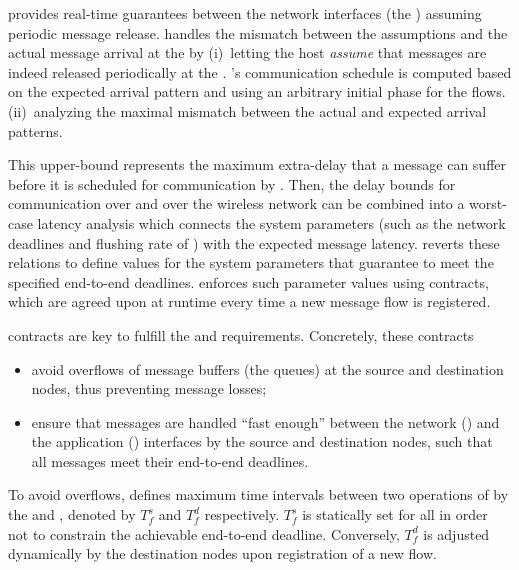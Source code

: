 \blink provides real-time guarantees between the network interfaces (\ie the \CPs) assuming periodic message release. \DRP handles the mismatch between the \blink assumptions and the actual message arrival at the \CPs by
(i)~letting the host \emph{assume} that messages are indeed released periodically at the \CPs.
  \blink's communication schedule is computed based on the expected arrival pattern and using an arbitrary initial phase for the flows.
(ii)~analyzing the maximal mismatch between the actual and expected arrival patterns.

This upper-bound represents the maximum extra-delay that a message can suffer before it is scheduled for communication by \blink.
Then, the delay bounds for communication over \bolt and over the wireless network can be combined into a worst-case latency analysis which connects the system parameters (such as the network deadlines and flushing rate of \bolt) with the expected message latency.
\DRP reverts these relations to define values for the system parameters
that guarantee to meet the specified end-to-end deadlines.
\DRP enforces such parameter values using contracts, which are agreed upon at runtime every time a new message flow is registered.

\DRP contracts are key to fulfill the  and  requirements. Concretely, these contracts
\begin{itemize}
  \item avoid overflows of message buffers (\eg the \bolt queues) at the source and destination nodes, thus preventing message losses;
  \item ensure that messages are handled ``fast enough'' between the network (\ie \CPs) and the application (\ie \APs) interfaces by the source and destination nodes, such that all messages meet their end-to-end deadlines.
\end{itemize}

To avoid overflows, \DRP defines {maximum time intervals} between two \opflush operations of \bolt by the \CPs and \APs, denoted by $T_f^s$ and $T_f^d$ respectively.
$T_f^s$ is statically set for all \CPs in order not to constrain the achievable end-to-end deadline.
Conversely, $T_f^d$ is adjusted dynamically by the destination nodes upon registration of a new flow.

